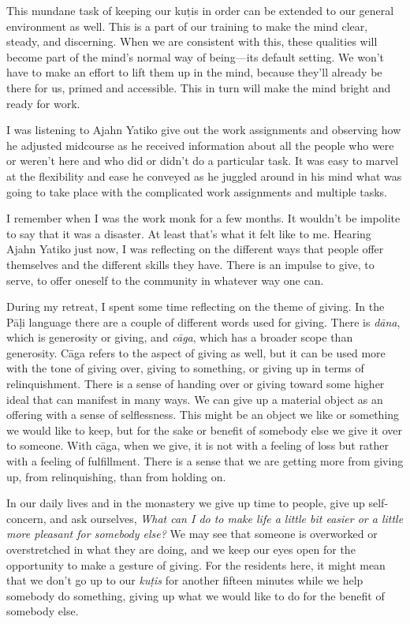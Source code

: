 This mundane task of keeping our kuṭis in order can be extended to 
our general environment as well. This is a part of our training to make 
the mind clear, steady, and discerning. When we are consistent with 
this, these qualities will become part of the mind's normal way of 
being---its default setting. We won't have to make an effort to lift 
them up in the mind, because they'll already be there for us, primed 
and accessible. This in turn will make the mind bright and ready for 
work.


I was listening to Ajahn Yatiko give out the work assignments and 
observing how he adjusted midcourse as he received information about 
all the people who were or weren't here and who did or didn't do a 
particular task. It was easy to marvel at the flexibility and ease he 
conveyed as he juggled around in his mind what was going to take place 
with the complicated work assignments and multiple tasks.

I remember when I was the work monk for a few months. It wouldn't be 
impolite to say that it was a disaster. At least that's what it felt 
like to me. Hearing Ajahn Yatiko just now, I was reflecting on the 
different ways that people offer themselves and the different skills 
they have. There is an impulse to give, to serve, to offer oneself to 
the community in whatever way one can.

During my retreat, I spent some time reflecting on the theme of giving. 
In the Pāḷi language there are a couple of different words used for 
giving. There is \emph{dāna}, which is generosity or giving, and 
\emph{cāga}, which has a broader scope than generosity. Cāga refers 
to the aspect of giving as well, but it can be used more with the tone 
of giving over, giving to something, or giving up in terms of 
relinquishment. There is a sense of handing over or giving toward some 
higher ideal that can manifest in many ways. We can give up a material 
object as an offering with a sense of selflessness. This might be an 
object we like or something we would like to keep, but for the sake or 
benefit of somebody else we give it over to someone. With cāga, when 
we give, it is not with a feeling of loss but rather with a feeling of 
fulfillment. There is a sense that we are getting more from giving up, 
from relinquishing, than from holding on.

In our daily lives and in the monastery we give up time to people, give 
up self-concern, and ask ourselves, \emph{What can I do to make life a 
little bit easier or a little more pleasant for somebody else?} We may 
see that someone is overworked or overstretched in what they are doing, 
and we keep our eyes open for the opportunity to make a gesture of 
giving. For the residents here, it might mean that we don't go up to 
our \emph{kuṭis} for another fifteen minutes while we help somebody 
do something, giving up what we would like to do for the benefit of 
somebody else.

